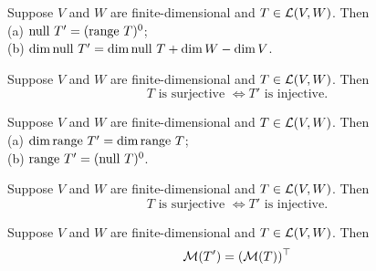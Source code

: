 \documentclass{extarticle}
\begin{document}
\begin{lemma}
    Suppose \(V\) and \(W\) are finite-dimensional and \(T \in \mathcal{L}(V, W)\). Then \\ 
    (a) \(\text{null } T' = (\text{range } T)^0\); \\ 
    (b) \(\dim \text{null } T' = \dim \text{null } T + \dim W - \dim V\).
\end{lemma}

\begin{thm}
    Suppose \(V\) and \(W\) are finite-dimensional and \(T \in \mathcal{L}(V, W)\). Then 
    \[T \text{ is surjective } \Longleftrightarrow T' \text{ is injective}.\]
\end{thm}

\begin{lemma}
    Suppose \(V\) and \(W\) are finite-dimensional and \(T \in \mathcal{L}(V, W)\). Then \\ 
    (a) \(\dim \text{range } T' = \dim \text{range } T\); \\ 
    (b) \(\text{range } T' = (\text{null } T)^0\).
\end{lemma}

\begin{thm}
    Suppose \(V\) and \(W\) are finite-dimensional and \(T \in \mathcal{L}(V, W)\). Then 
    \[T \text{ is surjective } \Longleftrightarrow T' \text{ is injective}.\]
\end{thm}

\begin{thm}
    Suppose \(V\) and \(W\) are finite-dimensional and \(T \in \mathcal{L}(V, W)\). Then 
    \[\mathcal{M}(T') = (\mathcal{M}(T))^\top\]
\end{thm}
\end{document}
